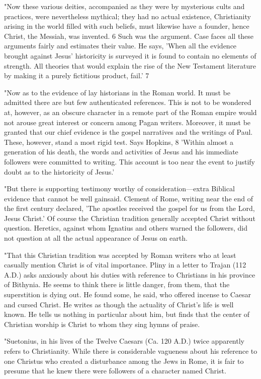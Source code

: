 "Now these various deities, accompanied as they were by mysterious cults and practices,
were nevertheless mythical; they had no actual existence, Christianity arising in the world
filled with such beliefs, must likewise have a founder, hence Christ, the Messiah, was
invented. 6 Such was the argument. Case faces all these arguments fairly and estimates their
value. He says, 'When all the evidence brought against Jesus' historicity is surveyed it is
found to contain no elements of strength. All theories that would explain the rise of the New
Testament literature by making it a purely fictitious product, fail.' 7

"Now as to the evidence of lay historians in the Roman world. It must be admitted there are
but few authenticated references. This is not to be wondered at, however, as an obscure
character in a remote part of the Roman empire would not arouse great interest or concern
among Pagan writers. Moreover, it must be granted that our chief evidence is the gospel
narratives and the writings of Paul. These, however, stand a most rigid test. Says Hopkins, 8
'Within almost a generation of his death, the words and activities of Jesus and his immediate
followers were committed to writing. This account is too near the event to justify doubt as to
the historicity of Jesus.'

"But there is supporting testimony worthy of consideration—extra Biblical evidence that
cannot be well gainsaid. Clement of Rome, writing near the end of the first century declared,
'The apostles received the gospel for us from the Lord, Jesus Christ.' Of course the Christian
tradition generally accepted Christ without question. Heretics, against whom Ignatius and
others warned the followers, did not question at all the actual appearance of Jesus on earth.

"That this Christian tradition was accepted by Roman writers who at least casually mention
Christ is of vital importance. Pliny in a letter to Trajan (112 A.D.) asks anxiously about his
duties with reference to Christians in his province of Bithynia. He seems to think there is
little danger, from them, that the superstition is dying out. He found some, he said, who
offered incense to Caesar and cursed Christ. He writes as though the actuality of Christ's life
is well known. He tells us nothing in particular about him, but finds that the center of
Christian worship is Christ to whom they sing hymns of praise.

"Suetonius, in his lives of the Twelve Caesars (Ca. 120 A.D.) twice apparently refers to
Christianity. While there is considerable vagueness about his reference to one Christus who
created a disturbance among the Jews in Rome, it is fair to presume that he knew there were
followers of a character named Christ.

